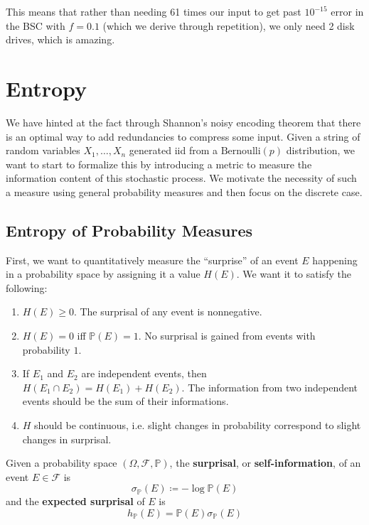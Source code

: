 \documentclass{article}
\begin{document}
    This means that rather than needing 61 times our input to get past $10^{-15}$ error in the BSC with $f = 0.1$ (which we derive through repetition), we only need 2 disk drives, which is amazing. 

\section{Entropy}

  We have hinted at the fact through Shannon's noisy encoding theorem that there is an optimal way to add redundancies to compress some input. Given a string of random variables $X_1, \ldots, X_n$ generated iid from a $\mathrm{Bernoulli}(p)$ distribution, we want to start to formalize this by introducing a metric to measure the information content of this stochastic process. We motivate the necessity of such a measure using general probability measures and then focus on the discrete case. 

  \subsection{Entropy of Probability Measures}

    First, we want to quantitatively measure the ``surprise'' of an event $E$ happening in a probability space by assigning it a value $H(E)$. We want it to satisfy the following: 
    \begin{enumerate}
      \item $H(E) \geq 0$. The surprisal of any event is nonnegative. 
      \item $H(E) = 0$ iff $\mathbb{P}(E) = 1$. No surprisal is gained from events with probability $1$. 
      \item If $E_1$ and $E_2$ are independent events, then $H(E_1 \cap E_2) = H(E_1) + H(E_2)$. The information from two independent events should be the sum of their informations. 
      \item $H$ should be continuous, i.e. slight changes in probability correspond to slight changes in surprisal. 
    \end{enumerate}

    \begin{definition}[Surprisal]
      Given a probability space $(\Omega, \mathcal{F}, \mathbb{P})$, the \textbf{surprisal}, or \textbf{self-information}, of an event $E \in \mathcal{F}$ is 
      \begin{equation}
        \sigma_\mathbb{P} (E) \coloneqq - \log \mathbb{P}(E)
      \end{equation}
      and the \textbf{expected surprisal} of $E$ is 
      \begin{equation}
        h_\mathbb{P} (E) = \mathbb{P}(E) \sigma_\mathbb{P} (E)
      \end{equation}
    \end{definition}
\end{document}
